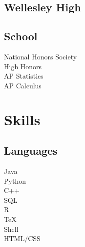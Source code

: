 \documentclass{resume}
\begin{document}
\begin{minipage}[t]{0.33\textwidth}
\subsection{Wellesley High}
\subsection{School}
National Honors Society\\
High Honors\\
{}
AP Statistics \\
AP Calculus \\




\section{Skills}

\subsection{Languages}
Java\\
Python \\
C++\\
SQL\\
R\\
TeX \\
Shell\\
HTML/CSS\\



\sectionsep



\end{minipage}
\end{document}
